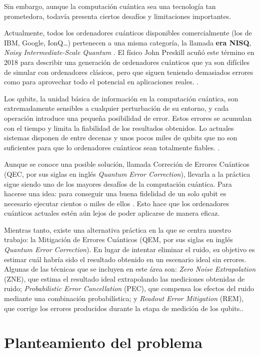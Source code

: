 Sin embargo, aunque la computación cuántica sea una tecnología tan prometedora, todavía presenta
ciertos desafíos y limitaciones importantes. 

Actualmente, todos los ordenadores cuánticos disponibles comercialmente (los de IBM, Google, IonQ\dots) pertenecen a una misma categoría, la llamada \textbf{era NISQ}, \textit{Noisy Intermediate-Scale Quantum} \cite{tqi2026nisq}. El físico John Preskill acuñó este término en 2018 para describir una generación de ordenadores cuánticos que ya son difíciles de simular con ordenadores clásicos, pero que siguen teniendo demasiados errores como para aprovechar todo el potencial en aplicaciones reales.
\cite{tqi2026nisq}.

Los qubits, la unidad básica de información en la computación cuántica, son extremadamente sensibles a cualquier perturbación de su entorno, y cada operación introduce una pequeña posibilidad de error. Estos errores se acumulan con el tiempo y limita la fiabilidad de los resultados obtenidos. Lo actuales sistemas disponen de entre decenas y unos pocos miles de qubits que no son suficientes para que lo ordenadores cuánticos sean totalmente fiables. \cite{tqi2026nisq}.

Aunque se conoce una posible solución, llamada Correción de Errores Cuánticos (QEC, por sus siglas en inglés \textit{Quantum Error Correction}), llevarla a la práctica sigue siendo uno de los mayores desafíos de la computación cuántica. Para hacerse una idea: para conseguir una buena fidelidad de un solo qubit es necesario ejecutar cientos o miles de ellos \cite{tqi2026nisq}. Esto hace que los ordenadores cuánticos actuales estén aún lejos de poder aplicarse de manera eficaz.

Mientras tanto, existe una alternativa práctica en la que se centra nuestro trabajo: la Mitigación de Errores Cuánticos (QEM, por sus siglas en inglés \textit{Quantum Error Correction}). En lugar de intentar eliminar el ruido, su objetivo es estimar cuál habría sido el resultado obtenido en un escenario ideal sin errores. Algunas de las técnicas que se incluyen en este área son: \textit{Zero Noise Extrapolation} (ZNE), que estima el resultado ideal extrapolando las mediciones obtenidas de ruido; \textit{Probabilistic Error Cancellation} (PEC), que compensa los efectos del ruido mediante una combinación probabilística; y \textit{Readout Error Mitigation} (REM), que corrige los errores producidos durante la etapa de medición de los qubits..


\section{Planteamiento del problema}
\label{sec:planteamiento}

